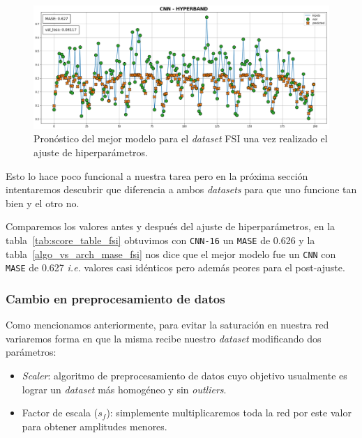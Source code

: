 \documentclass[a4paper,12pt]{article}
\begin{document}
\begin{figure}[H]
	\begin{center}
	\includegraphics[width=1\textwidth]{cnn_hp_best_fsi.png}
  	\caption{Pronóstico del mejor modelo para el \textit{dataset} FSI una vez realizado el ajuste de hiperparámetros.}
  	\label{fig:cnn_hp_best_fsi}
  	\end{center}
\end{figure}

Esto lo hace poco funcional a nuestra tarea pero en la próxima sección intentaremos descubrir que diferencia a ambos \textit{datasets} para que uno funcione tan bien y el otro no.

Comparemos los valores antes y después del ajuste de hiperparámetros, en la tabla~\ref{tab:score_table_fsi} obtuvimos con \texttt{CNN-16} un \texttt{MASE} de 0.626 y la tabla~\ref{algo_vs_arch_mase_fsi} nos dice que el mejor modelo fue un \texttt{CNN} con \texttt{MASE} de 0.627 \textit{i.e.} valores casi idénticos pero además peores para el post-ajuste. 

\subsubsection{Cambio en preprocesamiento de datos}
Como mencionamos anteriormente, para evitar la saturación en nuestra red variaremos forma en que la misma recibe nuestro \textit{dataset} modificando dos parámetros:
\begin{itemize}
	\item \textit{Scaler}: algoritmo de preprocesamiento de datos cuyo objetivo usualmente es lograr un \textit{dataset} más homogéneo y sin \textit{outliers}.
	\item Factor de escala ($s_f$): simplemente multiplicaremos toda la red por este valor para obtener amplitudes menores.
\end{itemize}
\end{document}
